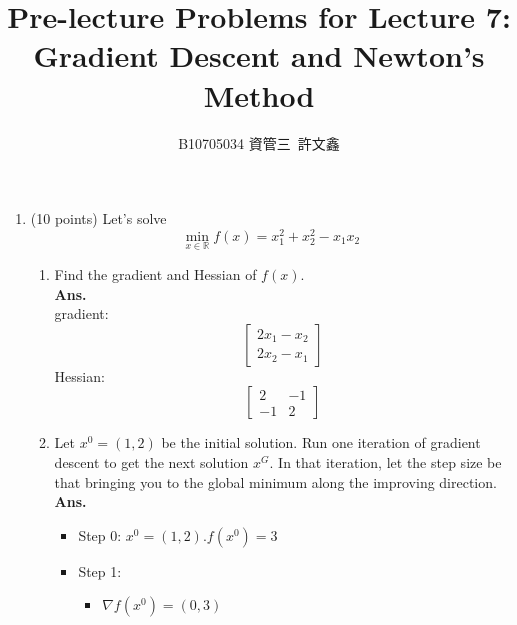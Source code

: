\documentclass[12pt]{article}
\title{Pre-lecture Problems for Lecture 7:\\ Gradient Descent and Newton’s Method}
\author{B10705034 資管三\ 許文鑫}
\begin{document}
\maketitle
\begin{enumerate}
      \item (10 points) Let’s solve
            \begin{equation*}
                  \min_{x\in \mathbb{R}} f(x) = x^2_1 +x^2_2 - x_1x_2
            \end{equation*}
            \begin{enumerate}
                  \item Find the gradient and Hessian of $f (x)$.\\
                        \textbf{Ans.}\\
                        gradient:
                        \begin{equation*}
                              \begin{bmatrix}
                                    2x_1 -x_2 \\
                                    2x_2 - x_1
                              \end{bmatrix}
                        \end{equation*}
                        Hessian:
                        \begin{equation*}
                              \begin{bmatrix}
                                    2  & -1 \\
                                    -1 & 2
                              \end{bmatrix}
                        \end{equation*}
                  \item Let $x^0 = (1, 2)$ be the initial solution. Run one iteration of gradient descent to get the next solution $x^G$. In that iteration, let the step size be that bringing you to the global minimum along the improving direction.\\
                        \textbf{Ans.}
                        \begin{itemize}
                              \item Step 0: $x^0 = (1,2). f(x^0) = 3$
                              \item Step 1:
                                    \begin{itemize}
                                          \item $\nabla f(x^0) = (0,3)$

\end{itemize}
\end{itemize}
\end{enumerate}
\end{enumerate}
\end{document}
